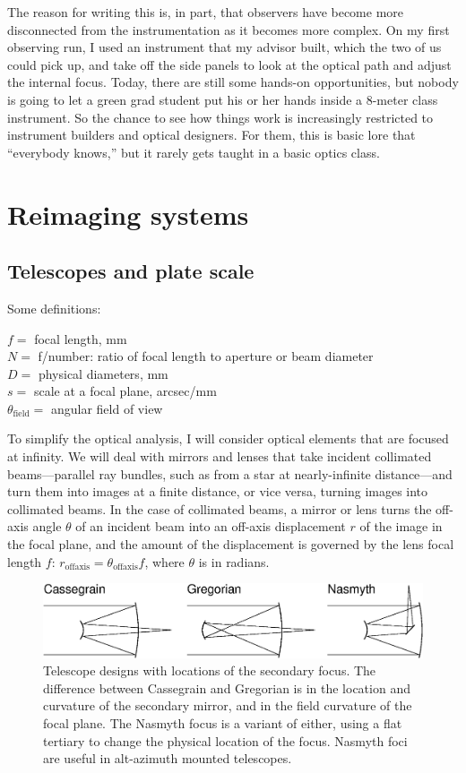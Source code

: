 \documentclass[12pt]{article}
\newcommand{\subscript}[1]{\mathrm{#1}}
\newcommand{\field}{\subscript{field}}
\newcommand{\offaxis}{\subscript{offaxis}}
\begin{document}
The reason for writing this is, in part, that observers have become
more disconnected from the instrumentation as it becomes more complex.
On my first observing run, I used an instrument that
my advisor built, which the two of us could pick up, and
take off the side panels to look at the optical path and adjust
the internal focus.  Today, there are still some hands-on
opportunities, but nobody is going to let a green 
grad student put his or her hands inside a 8-meter class instrument.
So the chance to see how things work is increasingly 
restricted to instrument builders and optical designers.  
For them, this is basic lore
that ``everybody knows,'' but it rarely gets taught in a
basic optics class.


\section{Reimaging systems}

\subsection{Telescopes and plate scale}

Some definitions:

\noindent
$f =$ focal length, mm \\
$N =$ f/number: ratio of focal length to aperture or beam diameter \\
$D =$ physical diameters, mm \\
$s =$ scale at a focal plane, arcsec/mm \\
$\theta_{\field} =$ angular field of view 

To simplify the optical analysis, I will consider optical
elements that are focused at infinity.
We will deal with mirrors and lenses that take
incident collimated beams---parallel ray bundles, such as from a
star at nearly-infinite distance---and turn them into images
at a finite distance, or vice versa, turning images into collimated 
beams.  In the case of collimated beams, a mirror or lens turns the off-axis
angle $\theta$ of an incident beam into an off-axis displacement $r$
of the image in the focal plane,
and the amount of the displacement is governed by the 
lens focal length $f$: $r_{\offaxis} = \theta_{\offaxis} f$, where
$\theta$ is in radians.

\begin{figure}[ht]
\centerline{
\includegraphics[width=5.5truein]{teltypes.eps}
}
\caption{Telescope designs with locations of the secondary focus.  
The difference between Cassegrain and Gregorian is in the
location and curvature of the secondary mirror, and in the
field curvature of the focal plane.  The Nasmyth focus is a
variant of either, using a flat tertiary to change the physical
location of the focus.  Nasmyth foci are useful in alt-azimuth
mounted telescopes.
}
\label{fig-teltypes}
\end{figure}
\end{document}
